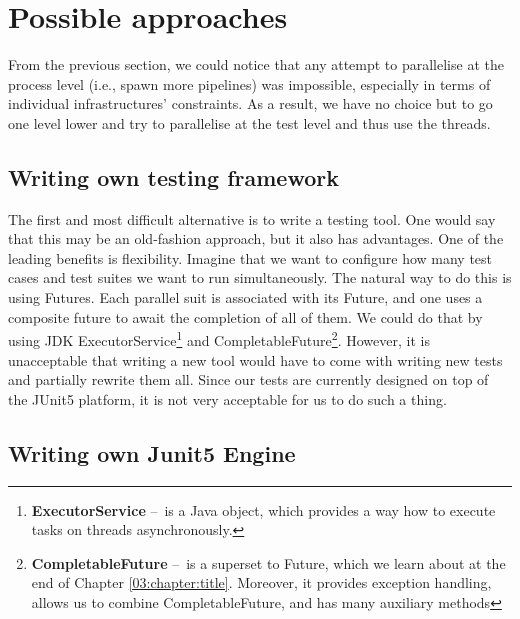 \section{Possible approaches}
\label{05:possibleapproaches}

From the previous section, we could notice that any attempt to parallelise at the process level (i.e., spawn more pipelines) was impossible, especially in terms of individual infrastructures' constraints. As a result, we have no choice but to go one level lower and try to parallelise at the test level and thus use the threads.

\subsection{Writing own testing framework}

The first and most difficult alternative is to write a testing tool. One would say that this may be an old-fashion approach, but it also has advantages. One of the leading benefits is flexibility. Imagine that we want to configure how many test cases and test suites we want to run simultaneously. The natural way to do this is using Futures. Each parallel suit is associated with its Future, and one uses a composite future to await the completion of all of them. We could do that by using JDK ExecutorService\footnote{\textbf{ExecutorService} \---\ is a Java object, which provides a way how to execute tasks on threads asynchronously.} and CompletableFuture\footnote{\textbf{CompletableFuture} \---\ is a superset to Future, which we learn about at the end of Chapter \ref{03:chapter:title}. Moreover, it provides exception handling, allows us to combine CompletableFuture, and has many auxiliary methods}. However, it is unacceptable that writing a new tool would have to come with writing new tests and partially rewrite them all. Since our tests are currently designed on top of the JUnit5 platform, it is not very acceptable for us to do such a thing.

\subsection{Writing own Junit5 Engine}


